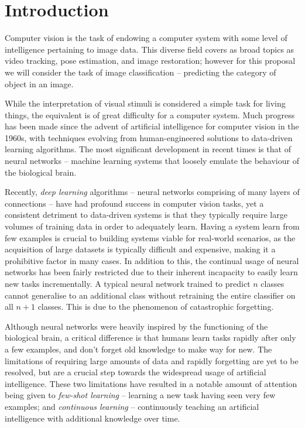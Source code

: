 \documentclass{report}
\begin{document}
\chapter{Introduction}
Computer vision is the task of endowing a computer system with some level of intelligence pertaining to image data. This diverse field covers as broad topics as video tracking, pose estimation, and image restoration; however for this proposal we will consider the task of image classification -- predicting the category of object in an image. \par
While the interpretation of visual stimuli is considered a simple task for living things, the equivalent is of great difficulty for a computer system. Much progress has been made since the advent of artificial intelligence for computer vision in the 1960s, with techniques evolving from human-engineered solutions to data-driven learning algorithms. The most significant development in recent times is that of neural networks -- machine learning systems that loosely emulate the behaviour of the biological brain. \par
Recently, \emph{deep learning} algorithms -- neural networks comprising of many layers of connections -- have had profound success in computer vision tasks, yet a consistent detriment to data-driven systems is that they typically require large volumes of training data in order to adequately learn. Having a system learn from few examples is crucial to building systems viable for real-world scenarios, as the acquisition of large datasets is typically difficult and expensive, making it a prohibitive factor in many cases. In addition to this, the continual usage of neural networks has been fairly restricted due to their inherent incapacity to easily learn new tasks incrementally. A typical neural network trained to predict $n$ classes cannot generalise to an additional class without retraining the entire classifier on all $n+1$ classes. This is due to the phenomenon of catastrophic forgetting. \par
Although neural networks were heavily inspired by the functioning of the biological brain, a critical difference is that humans learn tasks rapidly after only a few examples, and don't forget old knowledge to make way for new. The limitations of requiring large amounts of data and rapidly forgetting are yet to be resolved, but are a crucial step towards the widespread usage of artificial intelligence. These two limitations have resulted in a notable amount of attention being given to \emph{few-shot learning}\parencite{maml}\parencite{relationnet} -- learning a new task having seen very few examples; and  \emph{continuous learning}\parencite{lwf}\parencite{ewc}\parencite{hat} -- continuously teaching an artificial intelligence with additional knowledge over time. 
\end{document}
